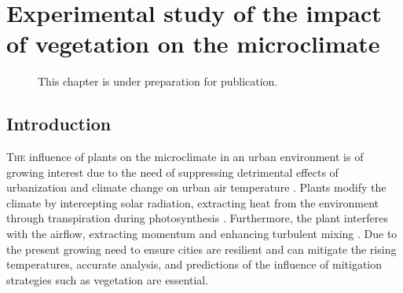 \chapter{Experimental study of the impact of vegetation on the microclimate}
\label{ch:microclimatestudy}
\def\figdir{chapters/ch04_microclimatestudy/figures/}

\begin{figure}[h]
	\centering
	\begin{minipage}{0.9\textwidth}
		\textsf{ \footnotesize This chapter is under preparation for publication.}
	\end{minipage}
\end{figure}
\vspace{2em}

\section{Introduction}

\lettrine[lines=3,nindent=0em,loversize=0.1]{T}{he} influence of plants on the microclimate in an urban environment is of growing interest due to the need of suppressing detrimental effects of urbanization and climate change on urban air temperature \citep{Chen2006,Demuzere2014,Dimoudi2003,Matthews2017,Shashua-Bar2009b,Shashua-Bar2000a}. Plants modify the climate by intercepting solar radiation, extracting heat from the environment through transpiration during photosynthesis \citep{nobel2009physicochemical}. Furthermore, the plant interferes with the airflow, extracting momentum and enhancing turbulent mixing \citep{Finnigan2009, Gromke2014, Sanz2003}. Due to the present growing need to ensure cities are resilient and can mitigate the rising temperatures, accurate analysis, and predictions of the influence of mitigation strategies such as vegetation are essential. 

